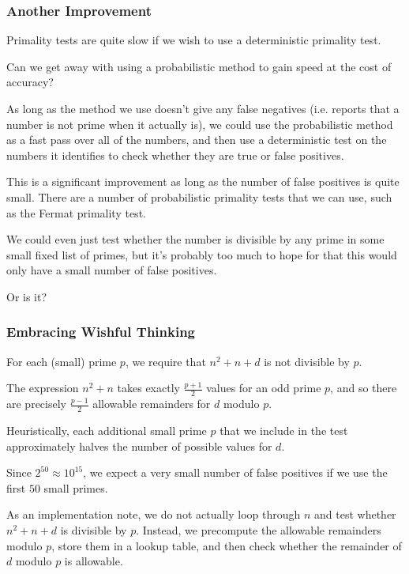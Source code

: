 \documentclass[handout]{beamer}
\begin{document}
\begin{frame}

	\frametitle{Another Improvement}

	Primality tests are quite slow if we wish to use a deterministic primality test. \pause

	Can we get away with using a probabilistic method to gain speed at the cost of accuracy? \pause

	As long as the method we use doesn't give any false negatives (i.e. reports that a number is not prime when it actually is), we could use the probabilistic method as a fast pass over all of the numbers, and then use a deterministic test on the numbers it identifies to check whether they are true or false positives. \pause

	This is a significant improvement as long as the number of false positives is quite small. There are a number of probabilistic primality tests that we can use, such as the Fermat primality test. \pause

	We could even just test whether the number is divisible by any prime in some small fixed list of primes, but it's probably too much to hope for that this would only have a small number of false positives. \pause

	Or is it?
\end{frame}

\begin{frame}

	\frametitle{Embracing Wishful Thinking}

	For each (small) prime $p$, we require that $n^2 + n + d$ is not divisible by $p$. \pause

	The expression $n^2 + n$ takes exactly $\frac{p + 1}{2}$ values for an odd prime $p$, and so there are precisely $\frac{p - 1}{2}$ allowable remainders for $d$ modulo $p$. \pause

	Heuristically, each additional small prime $p$ that we include in the test approximately halves the number of possible values for $d$. \pause

	Since $2^{50} \approx 10^{15}$, we expect a very small number of false positives if we use the first $50$ small primes. \pause

	As an implementation note, we do not actually loop through $n$ and test whether $n^2 + n + d$ is divisible by $p$. Instead, we precompute the allowable remainders modulo $p$, store them in a lookup table, and then check whether the remainder of $d$ modulo $p$ is allowable.

\end{frame}
\end{document}
